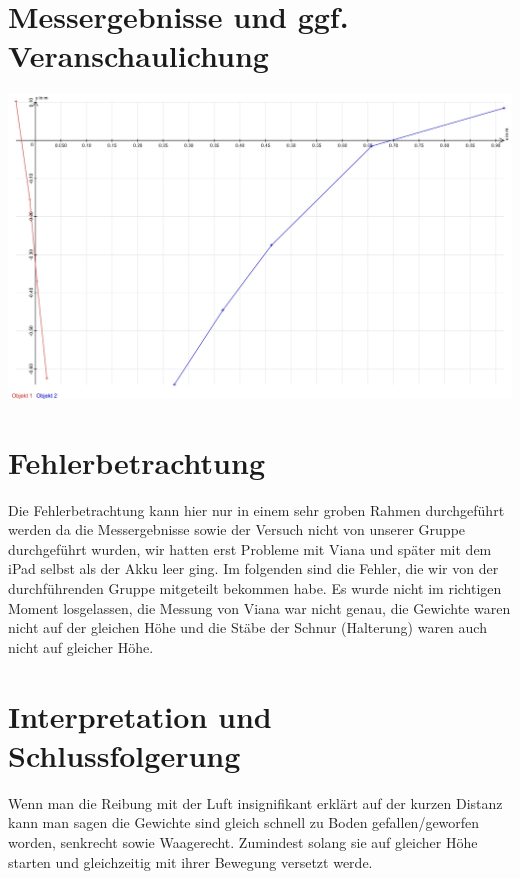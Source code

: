 \documentclass[12p]{article}
\begin{document}
\section*{Messergebnisse und ggf. Veranschaulichung}
\begin{center}
\includegraphics[width=\textwidth]{messergebnisse.jpeg}
\end{center}

\section*{Fehlerbetrachtung}
Die Fehlerbetrachtung kann hier nur in einem sehr groben Rahmen durchgeführt
werden da die Messergebnisse sowie der Versuch nicht von unserer Gruppe
durchgeführt wurden, wir hatten erst Probleme mit Viana und später mit dem iPad
selbst als der Akku leer ging. Im folgenden sind die Fehler, die wir von der
durchführenden Gruppe mitgeteilt bekommen habe.
Es wurde nicht im richtigen Moment losgelassen, die Messung von Viana war nicht
genau, die Gewichte waren nicht auf der gleichen Höhe und die Stäbe der Schnur
(Halterung) waren auch nicht auf gleicher Höhe.

\section*{Interpretation und Schlussfolgerung}
Wenn man die Reibung mit der Luft insignifikant erklärt auf der kurzen Distanz
kann man sagen die Gewichte sind gleich schnell zu Boden gefallen/geworfen
worden, senkrecht sowie Waagerecht. Zumindest solang sie auf gleicher Höhe
starten und gleichzeitig mit ihrer Bewegung versetzt werde.
\end{document}
